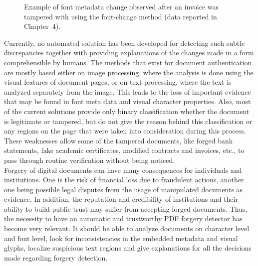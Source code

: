 \begin{figure}[H]
    \centering
    \caption{Example of font metadata change observed after an invoice was tampered with using the font-change method (data reported in Chapter~4).}
    \label{fig:font_mismatch_example}
\end{figure}

\noindent Currently, no automated solution has been developed for detecting such subtle discrepancies together with providing explanations of the changes made in a form comprehensible by humans. The methods that exist for document authentication are mostly based either on image processing, where the analysis is done using the visual features of document pages, or on text processing, where the text is analyzed separately from the image. This leads to the loss of important evidence that may be found in font meta data and visual character properties. Also, most of the current solutions provide only binary classification whether the document is legitimate or tampered, but do not give the reason behind this classification or any regions on the page that were taken into consideration during this process. These weaknesses allow some of the tampered documents, like forged bank statements, fake academic certificates, modified contracts and invoices, etc., to pass through routine verification without being noticed.\\

\noindent Forgery of digital documents can have many consequences for individuals and institutions. One is the risk of financial loss due to fraudulent actions, another one being possible legal disputes from the usage of manipulated documents as evidence. In addition, the reputation and credibility of institutions and their ability to build public trust may suffer from accepting forged documents. Thus, the necessity to have an automatic and trustworthy PDF forgery detector has become very relevant. It should be able to analyze documents on character level and font level, look for inconsistencies in the embedded metadata and visual glyphs, localize suspicious text regions and give explanations for all the decisions made regarding forgery detection.

